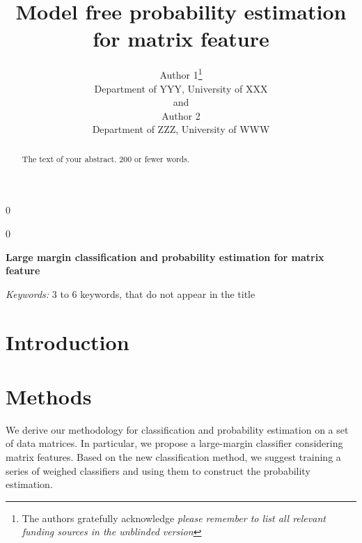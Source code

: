 \documentclass[12pt]{article}
\newcommand{\blind}{0}
\begin{document}
%

\def\spacingset#1{\renewcommand{\baselinestretch}%
{#1}\small\normalsize} \spacingset{1}



\blind
{
  \title{\bf Model free probability estimation for matrix feature}
  \author{Author 1\thanks{
    The authors gratefully acknowledge \textit{please remember to list all relevant funding sources in the unblinded version}}\hspace{.2cm}\\
    Department of YYY, University of XXX\\
    and \\
    Author 2 \\
    Department of ZZZ, University of WWW}
  \maketitle
} \fi

\blind
{
  \bigskip
  \bigskip
  \bigskip
  \begin{center}
    {\LARGE\bf Large margin classification and probability estimation for matrix feature}
\end{center}
  \medskip
} \fi

\bigskip
\begin{abstract}
The text of your abstract. 200 or fewer words.
\end{abstract}

\noindent%
{\it Keywords:}  3 to 6 keywords, that do not appear in the title
\vfill

\newpage
\spacingset{1.5} %
\section{Introduction}
\label{sec:intro}

\section{Methods}
\label{sec:meth}
We derive our methodology for classification and probability estimation on a set of data matrices.  In particular, we propose a large-margin classifier considering matrix features.  Based on the new classification method, we suggest training a series of weighed classifiers and using them to construct the probability estimation. 
\end{document}
